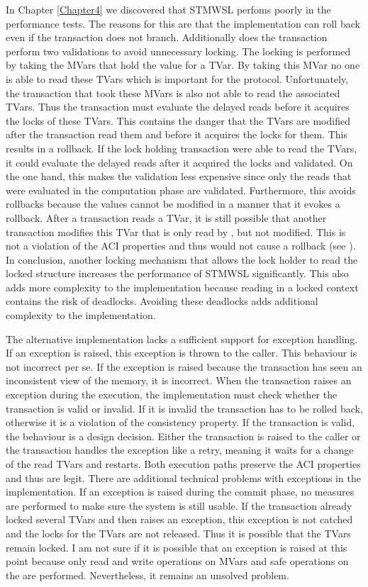 In Chapter \ref{Chapter4} we discovered that STMWSL perfoms poorly in the performance tests. The reasons for this are 
that the implementation can roll back even if the transaction does not branch. Additionally does the 
transaction perform two validations to avoid unnecessary locking. The locking is performed by taking
the MVars that hold the value for a TVar. By taking this MVar no one is able to read these TVars which 
is important for the protocol. Unfortunately, the transaction that took these MVars is also not able to read 
the associated TVars. Thus the transaction must evaluate the delayed reads before it acquires the locks of these 
TVars. This contains the danger that the TVars are modified after the transaction read them and before
it acquires the locks for them. This results in a rollback. If the lock holding transaction were able 
to read the TVars, it could evaluate the delayed reads after it acquired the locks and validated. On the
one hand, this makes the validation less expensive since only the reads that were evaluated in the 
computation phase are validated. Furthermore, this avoids rollbacks because the values cannot 
be modified in a manner that it evokes a rollback. After a transaction  reads a TVar, it is 
still possible that another transaction modifies this TVar that is only read by , but not modified.
This is not a violation of the ACI properties and thus would not cause a rollback (see \parencite{lockfreedom}).
In conclusion, another locking mechanism that allows the lock holder to read the locked structure
increases the performance of STMWSL significantly. This also adds more complexity to the implementation
because reading in a locked context contains the risk of deadlocks. Avoiding these deadlocks adds 
additional complexity to the implementation.

The alternative implementation lacks a sufficient support for exception handling. If an exception is
raised, this exception is thrown to the caller. This behaviour is not incorrect per se. If the 
exception is raised because the transaction has seen an inconsistent view of the memory, it is 
incorrect. When the transaction raises an exception during the execution, the implementation must 
check whether the transaction is valid or invalid. If it is invalid the transaction has to be rolled 
back, otherwise it is a violation of the consistency property. If the transaction is valid, the 
behaviour is a design decision. Either the transaction is raised to the caller or the transaction 
handles the exception like a retry, meaning it waits for a change of the read TVars and restarts.
Both execution paths preserve the ACI properties and thus are legit. There are additional 
technical problems with exceptions in the implementation. If an exception is raised during the 
commit phase, no measures are performed to make sure the system 
is still usable. If the transaction already locked several TVars and then raises an exception, this 
exception is not catched and the locks for the TVars are not released. Thus it is possible that 
the TVars remain locked. I am not sure if it is possible that an exception is raised at this point
because only read and write operations on MVars and safe operations on the  are performed.
Nevertheless, it remains an unsolved problem.

